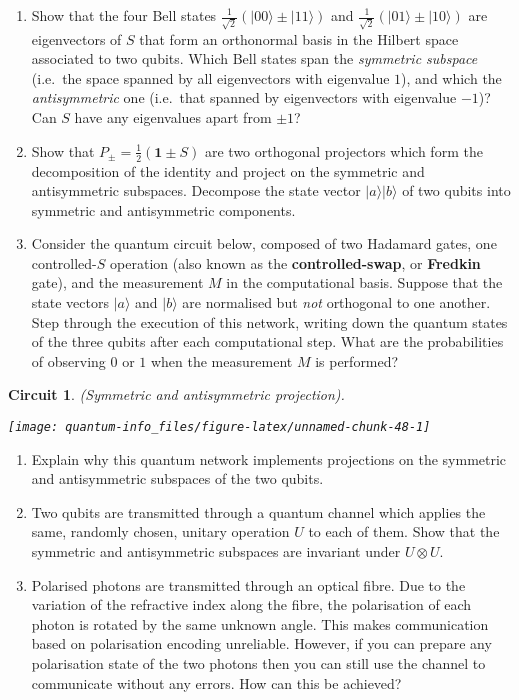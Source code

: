 \documentclass[fleqn]{article}
\newtheorem*{circuit}{Circuit}
\begin{document}
\begin{enumerate}
\def\labelenumi{\arabic{enumi}.}
\item
  Show that the four Bell states \(\frac{1}{\sqrt2}(|00\rangle\pm|11\rangle)\) and \(\frac{1}{\sqrt2}(|01\rangle\pm|10\rangle)\) are eigenvectors of \(S\) that form an orthonormal basis in the Hilbert space associated to two qubits.
  Which Bell states span the \emph{symmetric subspace} (i.e.~the space spanned by all eigenvectors with eigenvalue \(1\)), and which the \emph{antisymmetric} one (i.e.~that spanned by eigenvectors with eigenvalue \(-1\))?
  Can \(S\) have any eigenvalues apart from \(\pm1\)?
\item
  Show that \(P_\pm = \frac12(\mathbf{1}\pm S)\) are two orthogonal projectors which form the decomposition of the identity and project on the symmetric and antisymmetric subspaces.
  Decompose the state vector \(|a\rangle|b\rangle\) of two qubits into symmetric and antisymmetric components.
\item
  Consider the quantum circuit below, composed of two Hadamard gates, one controlled-\(S\) operation (also known as the \textbf{controlled-swap}, or \textbf{Fredkin} gate), and the measurement \(M\) in the computational basis.
  Suppose that the state vectors \(|a\rangle\) and \(|b\rangle\) are normalised but \emph{not} orthogonal to one another.
  Step through the execution of this network, writing down the quantum states of the three qubits after each computational step.
  What are the probabilities of observing \(0\) or \(1\) when the measurement \(M\) is performed?
\end{enumerate}

\begin{circuit}

(Symmetric and antisymmetric projection).

\begin{center}\texttt{[image: quantum-info\_files/figure-latex/unnamed-chunk-48-1]} \end{center}

\end{circuit}

\begin{enumerate}
\def\labelenumi{\arabic{enumi}.}
\setcounter{enumi}{3}
\item
  Explain why this quantum network implements projections on the symmetric and antisymmetric subspaces of the two qubits.
\item
  Two qubits are transmitted through a quantum channel which applies the same, randomly chosen, unitary operation \(U\) to each of them.
  Show that the symmetric and antisymmetric subspaces are invariant under \(U\otimes U\).
\item
  Polarised photons are transmitted through an optical fibre.
  Due to the variation of the refractive index along the fibre, the polarisation of each photon is rotated by the same unknown angle.
  This makes communication based on polarisation encoding unreliable.
  However, if you can prepare any polarisation state of the two photons then you can still use the channel to communicate without any errors.
  How can this be achieved?
\end{enumerate}
\end{document}
